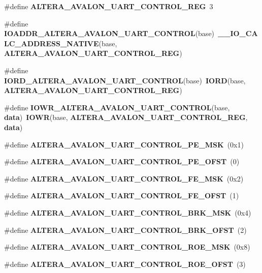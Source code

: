 \begin{DoxyCompactItemize}
\item 
\#define {\bf A\+L\+T\+E\+R\+A\+\_\+\+A\+V\+A\+L\+O\+N\+\_\+\+U\+A\+R\+T\+\_\+\+C\+O\+N\+T\+R\+O\+L\+\_\+\+R\+EG}~3
\item 
\#define {\bf I\+O\+A\+D\+D\+R\+\_\+\+A\+L\+T\+E\+R\+A\+\_\+\+A\+V\+A\+L\+O\+N\+\_\+\+U\+A\+R\+T\+\_\+\+C\+O\+N\+T\+R\+OL}(base)~{\bf \+\_\+\+\_\+\+I\+O\+\_\+\+C\+A\+L\+C\+\_\+\+A\+D\+D\+R\+E\+S\+S\+\_\+\+N\+A\+T\+I\+VE}(base, {\bf A\+L\+T\+E\+R\+A\+\_\+\+A\+V\+A\+L\+O\+N\+\_\+\+U\+A\+R\+T\+\_\+\+C\+O\+N\+T\+R\+O\+L\+\_\+\+R\+EG})
\item 
\#define {\bf I\+O\+R\+D\+\_\+\+A\+L\+T\+E\+R\+A\+\_\+\+A\+V\+A\+L\+O\+N\+\_\+\+U\+A\+R\+T\+\_\+\+C\+O\+N\+T\+R\+OL}(base)~{\bf I\+O\+RD}(base, {\bf A\+L\+T\+E\+R\+A\+\_\+\+A\+V\+A\+L\+O\+N\+\_\+\+U\+A\+R\+T\+\_\+\+C\+O\+N\+T\+R\+O\+L\+\_\+\+R\+EG})
\item 
\#define {\bf I\+O\+W\+R\+\_\+\+A\+L\+T\+E\+R\+A\+\_\+\+A\+V\+A\+L\+O\+N\+\_\+\+U\+A\+R\+T\+\_\+\+C\+O\+N\+T\+R\+OL}(base,  {\bf data})~{\bf I\+O\+WR}(base, {\bf A\+L\+T\+E\+R\+A\+\_\+\+A\+V\+A\+L\+O\+N\+\_\+\+U\+A\+R\+T\+\_\+\+C\+O\+N\+T\+R\+O\+L\+\_\+\+R\+EG}, {\bf data})
\item 
\#define {\bf A\+L\+T\+E\+R\+A\+\_\+\+A\+V\+A\+L\+O\+N\+\_\+\+U\+A\+R\+T\+\_\+\+C\+O\+N\+T\+R\+O\+L\+\_\+\+P\+E\+\_\+\+M\+SK}~(0x1)
\item 
\#define {\bf A\+L\+T\+E\+R\+A\+\_\+\+A\+V\+A\+L\+O\+N\+\_\+\+U\+A\+R\+T\+\_\+\+C\+O\+N\+T\+R\+O\+L\+\_\+\+P\+E\+\_\+\+O\+F\+ST}~(0)
\item 
\#define {\bf A\+L\+T\+E\+R\+A\+\_\+\+A\+V\+A\+L\+O\+N\+\_\+\+U\+A\+R\+T\+\_\+\+C\+O\+N\+T\+R\+O\+L\+\_\+\+F\+E\+\_\+\+M\+SK}~(0x2)
\item 
\#define {\bf A\+L\+T\+E\+R\+A\+\_\+\+A\+V\+A\+L\+O\+N\+\_\+\+U\+A\+R\+T\+\_\+\+C\+O\+N\+T\+R\+O\+L\+\_\+\+F\+E\+\_\+\+O\+F\+ST}~(1)
\item 
\#define {\bf A\+L\+T\+E\+R\+A\+\_\+\+A\+V\+A\+L\+O\+N\+\_\+\+U\+A\+R\+T\+\_\+\+C\+O\+N\+T\+R\+O\+L\+\_\+\+B\+R\+K\+\_\+\+M\+SK}~(0x4)
\item 
\#define {\bf A\+L\+T\+E\+R\+A\+\_\+\+A\+V\+A\+L\+O\+N\+\_\+\+U\+A\+R\+T\+\_\+\+C\+O\+N\+T\+R\+O\+L\+\_\+\+B\+R\+K\+\_\+\+O\+F\+ST}~(2)
\item 
\#define {\bf A\+L\+T\+E\+R\+A\+\_\+\+A\+V\+A\+L\+O\+N\+\_\+\+U\+A\+R\+T\+\_\+\+C\+O\+N\+T\+R\+O\+L\+\_\+\+R\+O\+E\+\_\+\+M\+SK}~(0x8)
\item 
\#define {\bf A\+L\+T\+E\+R\+A\+\_\+\+A\+V\+A\+L\+O\+N\+\_\+\+U\+A\+R\+T\+\_\+\+C\+O\+N\+T\+R\+O\+L\+\_\+\+R\+O\+E\+\_\+\+O\+F\+ST}~(3)

\end{DoxyCompactItemize}

